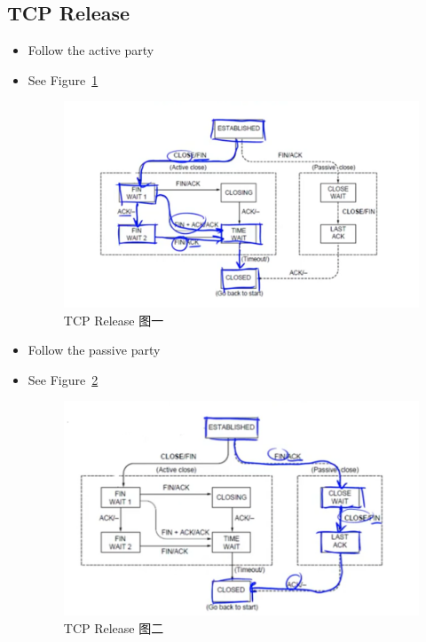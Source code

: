 \documentclass[12pt]{ctexart}   %
\begin{document}
	\subsection{TCP Release}
	\begin{itemize}
		\item Follow the active party
		\item See Figure~\ref{fig:6-4-4}
		  
		 \begin{figure}[h!] %
		\centering
		 \includegraphics[scale=0.7]{images/6-4-4}
		\caption{  TCP Release 图一 }
		 \label{fig:6-4-4}
		 \end{figure}
		 
		 \item Follow the passive party
		 \item See Figure~\ref{fig:6-4-5}
		  
		 \begin{figure}[h!] %
		\centering
		 \includegraphics[scale=0.7]{images/6-4-5}
		\caption{  TCP Release 图二 }
		 \label{fig:6-4-5}
		 \end{figure}
		 

\end{itemize}
\end{document}
